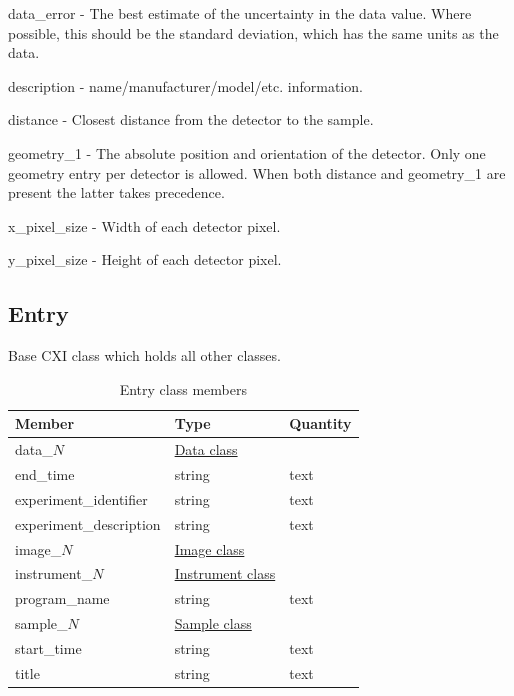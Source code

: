\documentclass[usletter,11pt]{article}
\newcommand{\member}[2]
{ \noindent
{ \color{softBlue}  #1 - } #2
\vspace{0.2cm}
}
\begin{document}
\member{data\_error}{The best estimate of the uncertainty in the data
 value. Where possible, this should be the standard deviation, which
 has the same units as the data.}

\member{description}{name/manufacturer/model/etc. information.}

\member{distance}{Closest distance from the detector to
the sample.}

\member{geometry\_1}{The absolute position and orientation of the
  detector.
  Only one geometry entry per detector is allowed. When both
  distance and geometry\_1 are present the latter takes precedence.
}

\member{x\_pixel\_size}{Width of each detector pixel.}

\member{y\_pixel\_size}{Height of each detector pixel.}




\subsection{Entry}
\label{table:entry}

Base CXI class which holds all other classes.

\begin{table}[h!]\sffamily \footnotesize
\caption{Entry class members}

\begin{tabular}{p{4.5cm} p{4.5cm}  p{2.5cm} }
\toprule
\bfseries Member     & \bfseries Type & \bfseries Quantity \\
\midrule
data\_$N$ & \hyperref[table:data]{Data class} & \\
end\_time  & string & text \\  
experiment\_identifier & string  & text \\
experiment\_description & string & text \\
image\_$N$ & \hyperref[table:image]{Image class} & \\
instrument\_$N$ & \hyperref[table:instrument]{Instrument class} & \\ 
program\_name & string & text \\
sample\_$N$ & \hyperref[table:sample]{Sample class} &  \\
start\_time  & string & text  \\ 
title & string & text \\
\bottomrule
\end{tabular}
\end{table}
\end{document}
